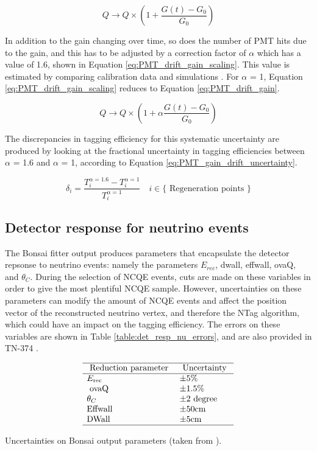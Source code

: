 \begin{equation}
    Q \longrightarrow Q \times\left(1+\frac{G(t)-G_0}{G_0}\right)
\label{eq:PMT_drift_gain}
\end{equation}

In addition to the gain changing over time, so does the number of PMT hits due to the gain, and this has to be adjusted by a correction factor of $\alpha$ which has a value of 1.6, shown in Equation \ref{eq:PMT_drift_gain_scaling}. This value is estimated by comparing calibration data and simulations \cite{linyan_thesis}. For $\alpha$ = 1, Equation \ref{eq:PMT_drift_gain_scaling} reduces to Equation \ref{eq:PMT_drift_gain}.


\begin{equation}
    Q \longrightarrow Q \times\left(1+\alpha\frac{G(t)-G_0}{G_0}\right)
\label{eq:PMT_drift_gain_scaling}
\end{equation}

The discrepancies in tagging efficiency for this systematic uncertainty are produced by looking at the fractional uncertainty in tagging efficiencies between $\alpha$ = 1.6 and $\alpha$ = 1, according to Equation \ref{eq:PMT_gain_drift_uncertainty}.

\begin{equation}
    \delta_i=\frac{T_i^{\alpha=1.6}-T_i^{\alpha=1}}{T_i^{\alpha=1}} \quad i \in\{\text { Regeneration points }\}
\label{eq:PMT_gain_drift_uncertainty}
\end{equation}


\subsection{Detector response for neutrino events}
 
The Bonsai fitter output produces parameters that encapsulate the detector repsonse to neutrino events: namely the parameters $E_{rec}$, dwall, effwall, ovaQ, and $\theta_C$. During the selection of NCQE events, cuts are made on these variables in order to give the most plentiful NCQE sample. However, uncertainties on these parameters can modify the amount of NCQE events and affect the position vector of the reconstructed neutrino vertex, and therefore the NTag algorithm, which could have an impact on the tagging efficiency. The errors on these variables are shown in Table \ref{table:det_resp_nu_errors}, and are also provided in TN-374 \cite{tn_374}.

\begin{table}
    $$
\begin{array}{ll}
\hline \text { Reduction parameter }  & \text { Uncertainty } \\
\hline E_{\text {rec }}  & \pm 5 \% \\
\text { ovaQ } & \pm 1.5 \% \\
\theta_C & \pm 2 \text { degree } \\
\text{Effwall} & \pm 50 \text {cm} \\
\text{DWall} & \pm 5 \text{cm}  \\
\hline
\end{array}
$$
\caption{Uncertainties on Bonsai output parameters (taken from \cite{tn_374}).}
\label{table:det_resp_nu_errors}
\end{table}

